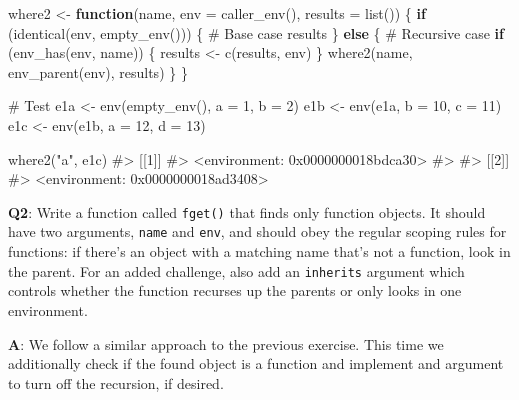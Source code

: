 \documentclass[
]{krantz}
\makeatletter
\newenvironment{Shaded}{\begin{snugshade}}{\end{snugshade}}
\newcommand{\CommentTok}[1]{\textcolor[rgb]{0.56,0.35,0.01}{\textit{#1}}}
\newcommand{\ControlFlowTok}[1]{\textcolor[rgb]{0.13,0.29,0.53}{\textbf{#1}}}
\newcommand{\DataTypeTok}[1]{\textcolor[rgb]{0.13,0.29,0.53}{#1}}
\newcommand{\DecValTok}[1]{\textcolor[rgb]{0.00,0.00,0.81}{#1}}
\newcommand{\KeywordTok}[1]{\textcolor[rgb]{0.13,0.29,0.53}{\textbf{#1}}}
\newcommand{\NormalTok}[1]{#1}
\newcommand{\StringTok}[1]{\textcolor[rgb]{0.31,0.60,0.02}{#1}}
\newenvironment{kframe}{%
\medskip{}
\setlength{\fboxsep}{.8em}
 \def\at@end@of@kframe{}%
 \ifinner\ifhmode%
  \def\at@end@of@kframe{\end{minipage}}%
  \begin{minipage}{\columnwidth}%
 \fi\fi%
 \def\FrameCommand##1{\hskip\@totalleftmargin \hskip-\fboxsep
 \colorbox{shadecolor}{##1}\hskip-\fboxsep
     \hskip-\linewidth \hskip-\@totalleftmargin \hskip\columnwidth}%
 \MakeFramed {\advance\hsize-\width
   \@totalleftmargin\z@ \linewidth\hsize
   \@setminipage}}%
 {\par\unskip\endMakeFramed%
 \at@end@of@kframe}
\renewenvironment{Shaded}{\begin{kframe}}{\end{kframe}}
\renewcommand{\KeywordTok} [1]{\textcolor[rgb]{0.00,0.44,0.13}{{#1}}}
\renewcommand{\DataTypeTok}[1]{\textcolor[rgb]{0.56,0.13,0.00}{{#1}}}
\renewcommand{\DecValTok}  [1]{\textcolor[rgb]{0.25,0.63,0.44}{{#1}}}
\renewcommand{\StringTok}  [1]{\textcolor[rgb]{0.25,0.44,0.63}{{#1}}}
\renewcommand{\CommentTok} [1]{\textcolor[rgb]{0.38,0.63,0.69}{{#1}}}
\renewcommand{\NormalTok}  [1]{{#1}}
\makeatother
\begin{document}
\begin{Shaded}
\begin{Highlighting}[]
\NormalTok{where2 <-}\StringTok{ }\ControlFlowTok{function}\NormalTok{(name, }\DataTypeTok{env =} \KeywordTok{caller_env}\NormalTok{(), }\DataTypeTok{results =} \KeywordTok{list}\NormalTok{()) \{}
  \ControlFlowTok{if}\NormalTok{ (}\KeywordTok{identical}\NormalTok{(env, }\KeywordTok{empty_env}\NormalTok{())) \{}
    \CommentTok{# Base case}
\NormalTok{    results}
\NormalTok{  \} }\ControlFlowTok{else}\NormalTok{ \{}
    \CommentTok{# Recursive case}
    \ControlFlowTok{if}\NormalTok{ (}\KeywordTok{env_has}\NormalTok{(env, name)) \{}
\NormalTok{      results <-}\StringTok{ }\KeywordTok{c}\NormalTok{(results, env)}
\NormalTok{    \}}
    \KeywordTok{where2}\NormalTok{(name, }\KeywordTok{env_parent}\NormalTok{(env), results)}
\NormalTok{  \}}
\NormalTok{\}}

\CommentTok{# Test}
\NormalTok{e1a <-}\StringTok{ }\KeywordTok{env}\NormalTok{(}\KeywordTok{empty_env}\NormalTok{(), }\DataTypeTok{a =} \DecValTok{1}\NormalTok{, }\DataTypeTok{b =} \DecValTok{2}\NormalTok{)}
\NormalTok{e1b <-}\StringTok{ }\KeywordTok{env}\NormalTok{(e1a, }\DataTypeTok{b =} \DecValTok{10}\NormalTok{, }\DataTypeTok{c =} \DecValTok{11}\NormalTok{)}
\NormalTok{e1c <-}\StringTok{ }\KeywordTok{env}\NormalTok{(e1b, }\DataTypeTok{a =} \DecValTok{12}\NormalTok{, }\DataTypeTok{d =} \DecValTok{13}\NormalTok{)}

\KeywordTok{where2}\NormalTok{(}\StringTok{"a"}\NormalTok{, e1c)}
\CommentTok{#> [[1]]}
\CommentTok{#> <environment: 0x0000000018bdca30>}
\CommentTok{#> }
\CommentTok{#> [[2]]}
\CommentTok{#> <environment: 0x0000000018ad3408>}
\end{Highlighting}
\end{Shaded}

\textbf{{Q2}}: Write a function called \texttt{fget()} that finds only function objects. It should have two arguments, \texttt{name} and \texttt{env}, and should obey the regular scoping rules for functions: if there's an object with a matching name that's not a function, look in the parent. For an added challenge, also add an \texttt{inherits} argument which controls whether the function recurses up the parents or only looks in one environment.

\textbf{{A}}: We follow a similar approach to the previous exercise. This time we additionally check if the found object is a function and implement and argument to turn off the recursion, if desired.
\end{document}
